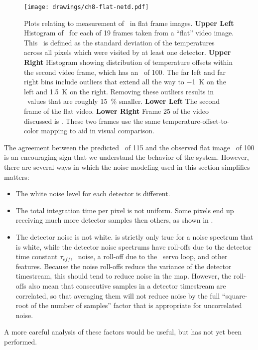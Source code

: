 \begin{figure}
\centering
\texttt{[image: drawings/ch8-flat-netd.pdf]}
\caption{
  Plots relating to measurement of \NETD\ in flat frame images.
  \textbf{Upper Left} Histogram of \NETD\ for each of 19 frames taken from a ``flat'' video image. This \NETD\ is defined as the standard deviation of the temperatures across all pixels which were visited by at least one detector. 
  \textbf{Upper Right} Histogram showing distribution of temperature offsets within the second video frame, which has an \NETD\ of \SI{100}{\mK}.
                       The far left and far right bins include outliers that extend all the way to \SI{-1}{\K} on the left and \SI{1.5}{\K} on the right.
                       Removing these outliers results in \NETD\ values that are roughly \SI{15}{\percent} smaller.
  \textbf{Lower Left} The second frame of the flat video.
  \textbf{Lower Right} Frame 25 of the video discussed is .
These two frames use the same temperature-offset-to-color mapping to aid in visual comparison.
}
\label{fig:ch8-flat-netd}
\end{figure}

The agreement between the predicted \NETD\ of \SI{115}{\mK} and the observed flat image \NETD\ of \SI{100}{\mK} is an encouraging sign that we understand the behavior of the system.
However, there are several ways in which the noise modeling used in this section simplifies matters:
\begin{itemize}
\item The white noise level for each detector is different.
\item The total integration time per pixel is not uniform.
      Some pixels end up receiving much more detector samples then others, as shown in .
\item The detector noise is not white.
       is strictly only true for a noise spectrum that is white, while the detector noise spectrums have roll-offs due to the detector time constant $\tau_{eff}$, \SQUID\ noise, a roll-off due to the \SQUID\ servo loop, and other features.
      Because the noise roll-offs reduce the variance of the detector timestream, this should tend to reduce noise in the map.
      However, the roll-offs also mean that consecutive samples in a detector timestream are correlated, so that averaging them will not reduce noise by the full ``square-root of the number of samples'' factor that is appropriate for uncorrelated noise.
\end{itemize}
A more careful analysis of these factors would be useful, but has not yet been performed.

